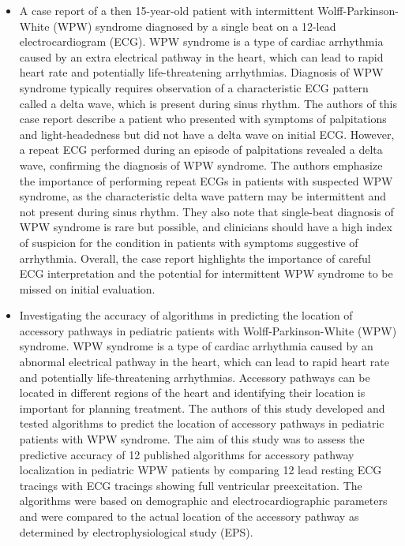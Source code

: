 \begin{itemize}
	\item A case report of a then 15-year-old patient with intermittent Wolff-Parkinson-White (WPW) syndrome diagnosed by a single beat on a 12-lead electrocardiogram (ECG). WPW syndrome is a type of cardiac arrhythmia caused by an extra electrical pathway in the heart, which can lead to rapid heart rate and potentially life-threatening arrhythmias. Diagnosis of WPW syndrome typically requires observation of a characteristic ECG pattern called a delta wave, which is present during sinus rhythm. The authors of this case report describe a patient who presented with symptoms of palpitations and light-headedness but did not have a delta wave on initial ECG. However, a repeat ECG performed during an episode of palpitations revealed a delta wave, confirming the diagnosis of WPW syndrome. The authors emphasize the importance of performing repeat ECGs in patients with suspected WPW syndrome, as the characteristic delta wave pattern may be intermittent and not present during sinus rhythm. They also note that single-beat diagnosis of WPW syndrome is rare but possible, and clinicians should have a high index of suspicion for the condition in patients with symptoms suggestive of arrhythmia. Overall, the case report highlights the importance of careful ECG interpretation and the potential for intermittent WPW syndrome to be missed on initial evaluation.
	 
	\item Investigating the accuracy of algorithms in predicting the location of accessory pathways in pediatric patients with Wolff-Parkinson-White (WPW) syndrome. WPW syndrome is a type of cardiac arrhythmia caused by an abnormal electrical pathway in the heart, which can lead to rapid heart rate and potentially life-threatening arrhythmias. Accessory pathways can be located in different regions of the heart and identifying their location is important for planning treatment. The authors of this study developed and tested algorithms to predict the location of accessory pathways in pediatric patients with WPW syndrome. The aim of this study was to assess the predictive accuracy of 12 published algorithms for accessory pathway localization in pediatric WPW patients by comparing 12 lead resting ECG tracings with ECG tracings showing full ventricular preexcitation. The algorithms were based on demographic and electrocardiographic parameters and were compared to the actual location of the accessory pathway as determined by electrophysiological study (EPS). 
	

\end{itemize}
